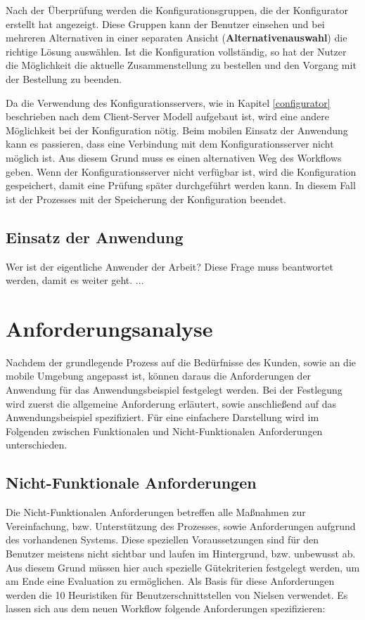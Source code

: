 Nach der Überprüfung werden die  Konfigurationsgruppen, die der Konfigurator erstellt hat angezeigt. Diese Gruppen kann der Benutzer einsehen und bei mehreren Alternativen in einer 
separaten Ansicht (\textbf{Alternativenauswahl}) die richtige Lösung auswählen. Ist die Konfiguration vollständig, so hat der Nutzer die Möglichkeit die aktuelle Zusammenstellung zu bestellen und den Vorgang mit der Bestellung zu beenden. 

Da die Verwendung des Konfigurationsservers, wie in Kapitel \ref{configurator} beschrieben nach dem Client-Server Modell aufgebaut ist, wird eine andere Möglichkeit bei der Konfiguration nötig. Beim mobilen Einsatz der Anwendung kann es passieren, dass eine Verbindung mit dem Konfigurationsserver nicht möglich ist. Aus diesem Grund muss es einen alternativen Weg des Workflows geben. Wenn der Konfigurationsserver nicht verfügbar ist, wird die Konfiguration gespeichert, damit eine Prüfung später durchgeführt werden kann. In diesem Fall ist der Prozesses mit der Speicherung der Konfiguration beendet.

\subsection{Einsatz der Anwendung}
Wer ist der eigentliche Anwender der Arbeit? Diese Frage muss beantwortet werden, damit es weiter geht. ...


\section{Anforderungsanalyse} \label{requirements}
Nachdem der grundlegende Prozess auf die Bedürfnisse des Kunden, sowie an die mobile Umgebung angepasst ist, können daraus die Anforderungen der Anwendung für das Anwendungsbeispiel festgelegt werden. Bei der Festlegung wird zuerst die allgemeine Anforderung erläutert, sowie anschließend auf das Anwendungsbeispiel spezifiziert. Für eine einfachere Darstellung wird im Folgenden zwischen Funktionalen und Nicht-Funktionalen Anforderungen unterschieden. 

\subsection{Nicht-Funktionale Anforderungen}\label{non_functional_requirements}
Die Nicht-Funktionalen Anforderungen betreffen alle Maßnahmen zur Vereinfachung, bzw. Unterstützung des Prozesses, sowie Anforderungen aufgrund des vorhandenen Systems. Diese speziellen Voraussetzungen sind für den Benutzer meistens nicht sichtbar und laufen im Hintergrund, bzw. unbewusst ab. Aus diesem Grund müssen hier auch spezielle Gütekriterien festgelegt werden, um am Ende eine Evaluation zu ermöglichen. Als Basis für diese Anforderungen werden die 10 Heuristiken für Benutzerschnittstellen von Nielsen \cite{bib:heuristicsNielsen} verwendet.
Es lassen sich aus dem neuen Workflow folgende Anforderungen spezifizieren:



